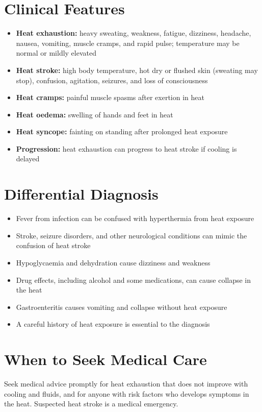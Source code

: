 \section*{Clinical Features}
\begin{itemize}
    \item \textbf{Heat exhaustion:} heavy sweating, weakness, fatigue, dizziness, headache, nausea, vomiting, muscle cramps, and rapid pulse; temperature may be normal or mildly elevated
    \item \textbf{Heat stroke:} high body temperature, hot dry or flushed skin (sweating may stop), confusion, agitation, seizures, and loss of consciousness
    \item \textbf{Heat cramps:} painful muscle spasms after exertion in heat
    \item \textbf{Heat oedema:} swelling of hands and feet in heat
    \item \textbf{Heat syncope:} fainting on standing after prolonged heat exposure
    \item \textbf{Progression:} heat exhaustion can progress to heat stroke if cooling is delayed
\end{itemize}

\section*{Differential Diagnosis}
\begin{itemize}
    \item Fever from infection can be confused with hyperthermia from heat exposure
    \item Stroke, seizure disorders, and other neurological conditions can mimic the confusion of heat stroke
    \item Hypoglycaemia and dehydration cause dizziness and weakness
    \item Drug effects, including alcohol and some medications, can cause collapse in the heat
    \item Gastroenteritis causes vomiting and collapse without heat exposure
    \item A careful history of heat exposure is essential to the diagnosis
\end{itemize}

\section*{When to Seek Medical Care}
Seek medical advice promptly for heat exhaustion that does not improve with cooling and fluids, and for anyone with risk factors who develops symptoms in the heat. Suspected heat stroke is a medical emergency.

